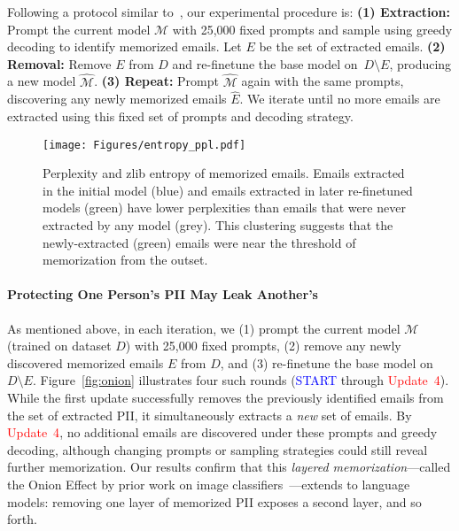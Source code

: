 Following a protocol similar to~\citet{onioneffect}, our experimental procedure is:
     \textbf{(1) Extraction:} Prompt the current model \(\mathcal{M}\) with 25,000 fixed prompts and sample using greedy decoding to identify memorized emails. Let \(E\) be the set of extracted emails.
     \textbf{(2) Removal:} Remove \(E\) from \(D\) and re-finetune the base model on \(\,D \setminus E\), producing a new model \(\hat{\mathcal{M}}\).
     \textbf{(3) Repeat:} Prompt \(\hat{\mathcal{M}}\) again with the same prompts, discovering any newly memorized emails \(\hat{E}\).
We iterate until no more emails are extracted using this fixed set of prompts and decoding strategy.









\begin{figure}[t] 
\centering
\texttt{[image: Figures/entropy\_ppl.pdf]} 
\caption{{Perplexity and zlib entropy of memorized emails.} Emails extracted in the initial model (blue) and emails extracted in later re-finetuned models %
(green) have lower perplexities than emails that were never extracted by any model (grey). This clustering suggests that the newly-extracted (green) emails were near the threshold of memorization from the outset.\
} \label{fig:entropyvsppl}
\end{figure}



\paragraph{Protecting One Person's PII May Leak Another's}



As mentioned above, in each iteration, we (1) prompt the current model \(\mathcal{M}\) (trained on dataset \(D\)) with 25,000 fixed prompts, (2) remove any newly discovered memorized emails \(E\) from \(D\), and (3) re-finetune the base model on \(D \setminus E\). 
Figure~\ref{fig:onion} illustrates four such rounds (\textcolor{blue}{START} through \textcolor{red}{Update~4}). 
While the first update successfully removes the previously identified emails from the set of extracted PII, it simultaneously extracts a \emph{new} set of emails. 
By \textcolor{red}{Update~4}, no additional emails are discovered under these prompts and greedy decoding, although changing prompts or sampling strategies could still reveal further memorization. 
 Our results confirm that this \emph{layered memorization}---called the Onion Effect by prior work on image classifiers~\cite{onioneffect}---extends to language models: removing one layer of memorized PII exposes a second layer, and so forth.

